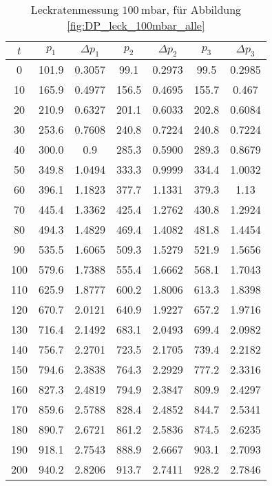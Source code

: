 \begin{table}[H]
    \centering
    \caption{Leckratenmessung $\SI{100}{\milli\bar}$, für Abbildung \ref{fig:DP_leck_100mbar_alle}}
    \label{tab:DP_leck_100mbar_alle}
    \begin{tabular}{c c c c c c c}
        \toprule
        {$t$} & {$p_1$} & {$\Delta p_1$} & {$p_2$} & {$\Delta p_2$} & {$p_3$} & {$\Delta p_3$} \\
        \midrule
        0 & 101.9 & 0.3057 & 99.1 & 0.2973 & 99.5 & 0.2985 \\
        10 & 165.9 & 0.4977 & 156.5 & 0.4695 & 155.7 & 0.467  \\
        20 & 210.9 & 0.6327 & 201.1 & 0.6033 & 202.8 & 0.6084  \\
        30 & 253.6 & 0.7608 & 240.8 & 0.7224 & 240.8 & 0.7224  \\
        40 & 300.0 & 0.9 & 285.3 & 0.5900 & 289.3 & 0.8679  \\
        50 & 349.8 & 1.0494 & 333.3 & 0.9999 & 334.4 & 1.0032  \\
        60 & 396.1 & 1.1823 & 377.7 & 1.1331 & 379.3 & 1.13  \\
        70 & 445.4 & 1.3362 & 425.4 & 1.2762 & 430.8 & 1.2924  \\
        80 & 494.3 & 1.4829 & 469.4 & 1.4082 & 481.8 & 1.4454  \\
        90 & 535.5 & 1.6065 & 509.3 & 1.5279 & 521.9 & 1.5656  \\
        100 & 579.6 & 1.7388 & 555.4 & 1.6662 & 568.1 & 1.7043 \\
        110 & 625.9 & 1.8777 & 600.2 & 1.8006 & 613.3 & 1.8398 \\
        120 & 670.7 & 2.0121 & 640.9 & 1.9227 & 657.2 & 1.9716 \\
        130 & 716.4 & 2.1492 & 683.1 & 2.0493 & 699.4 & 2.0982 \\
        140 & 756.7 & 2.2701 & 723.5 & 2.1705 & 739.4 & 2.2182 \\
        150 & 794.6 & 2.3838 & 764.3 & 2.2929 & 777.2 & 2.3316 \\
        160 & 827.3 & 2.4819 & 794.9 & 2.3847 & 809.9 & 2.4297 \\
        170 & 859.6 & 2.5788 & 828.4 & 2.4852 & 844.7 & 2.5341 \\
        180 & 890.7 & 2.6721 & 861.2 & 2.5836 & 874.5 & 2.6235 \\
        190 & 918.1 & 2.7543 & 888.9 & 2.6667 & 903.1 & 2.7093 \\
        200 & 940.2 & 2.8206 & 913.7 & 2.7411 & 928.2 & 2.7846 \\
        \bottomrule
    \end{tabular}
\end{table}

